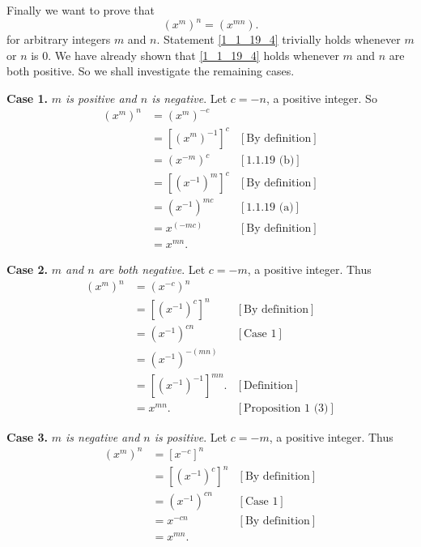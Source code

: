 \documentclass[9pt]{article}
\begin{document}
\begin{enumerate}
\begin{enumerate}
               Finally we want to prove that
               \begin{equation} \label{1_1_19_4}
                  (x^m)^n = (x^{mn}).
               \end{equation}
               for arbitrary integers $m$ and $n$. Statement \eqref{1_1_19_4}
               trivially holds whenever $m$ or $n$ is 0. We have already shown
               that \eqref{1_1_19_4} holds whenever $m$ and $n$ are both
               positive. So we shall investigate the remaining cases.

               \textbf{Case 1.} \textit{$m$ is positive and $n$ is negative}. 
               Let $c = -n$, a positive integer. So
               \begin{align*}
                  (x^m)^n &= (x^m)^{-c} \\
                          &= [(x^m)^{-1}]^c &[\text{By definition}] \\
                          &= (x^{-m})^c &[\text{1.1.19 (b)}] \\
                          &= [(x^{-1})^m]^c &[\text{By definition}] \\
                          &= (x^{-1})^{mc} &[\text{1.1.19 (a)}] \\
                          &= x^{(-mc)} &[\text{By definition}] \\
                          &= x^{mn}.
               \end{align*}

               \textbf{Case 2.} \textit{$m$ and $n$ are both negative}. Let 
               $c = -m$, a positive integer. Thus
               \begin{align*}
                  (x^m)^n &= (x^{-c})^n \\
                          &= [(x^{-1})^c]^n &[\text{By definition}] \\
                          &= (x^{-1})^{cn} &[\text{Case 1}] \\
                          &= (x^{-1})^{-(mn)} \\
                          &= [(x^{-1})^{-1}]^{mn}. &[\text{Definition}] \\
                          &= x^{mn}. &[\text{Proposition 1 (3)}]
               \end{align*}

               \textbf{Case 3.} \textit{$m$ is negative and $n$ is positive}.
               Let $c = -m$, a positive integer. Thus
               \begin{align*}
                  (x^m)^n &= [x^{-c}]^n \\
                          &= [(x^{-1})^c]^n &[\text{By definition}] \\
                          &= (x^{-1})^{cn} &[\text{Case 1}] \\
                          &= x^{-cn} &[\text{By definition}] \\
                          &= x^{mn}.
               \end{align*}


\end{enumerate}
\end{enumerate}
\end{document}

